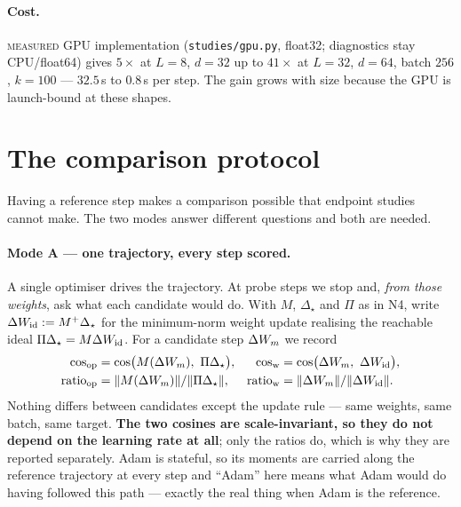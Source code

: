 \documentclass{article}
\newcommand{\RUN}{{\color{blue!70!black}\textsc{measured}}}
\theoremstyle{plain}\newtheorem{theorem}{Theorem}\newtheorem{lemma}[theorem]{Lemma}
\theoremstyle{definition}\newtheorem{definition}[theorem]{Definition}
\newcommand{\Dstar}{\Delta_\star}\newcommand{\Lam}{\Lambda}
\begin{document}
\paragraph{Cost.} \RUN{} GPU implementation (\texttt{studies/gpu.py}, float32; diagnostics stay
CPU/float64) gives $5\times$ at $L{=}8$, $d{=}32$ up to $41\times$ at $L{=}32$, $d{=}64$,
batch $256$, $k{=}100$ --- $32.5$\,s to $0.8$\,s per step. The gain grows with size because the
GPU is launch-bound at these shapes.

\section{The comparison protocol}\label{sec:protocol}

Having a reference step makes a comparison possible that endpoint studies cannot make. The two
modes answer different questions and both are needed.

\paragraph{Mode A --- one trajectory, every step scored.}
A single optimiser drives the trajectory. At probe steps we stop and, \emph{from those weights},
ask what each candidate would do. With $M$, $\Dstar$ and $\Pi$ as in N4, write
$\dW_{\mathrm{id}}:=M^{+}\Dstar$ for the minimum-norm weight update realising the reachable ideal
$\Pi\Dstar=M\dW_{\mathrm{id}}$. For a candidate step $\Delta W_m$ we record
\begin{align*}
  \cos_{\mathrm{op}} &= \cos\!\big(M(\dW_m),\ \Pi\Dstar\big),
  &\cos_{\mathrm{w}} &= \cos\!\big(\dW_m,\ \dW_{\mathrm{id}}\big),\\
  \mathrm{ratio}_{\mathrm{op}} &= \|M(\dW_m)\|/\|\Pi\Dstar\|,
  &\mathrm{ratio}_{\mathrm{w}} &= \|\dW_m\|/\|\dW_{\mathrm{id}}\|.
\end{align*}
Nothing differs between candidates except the update rule --- same weights, same batch, same
target. \textbf{The two cosines are scale-invariant, so they do not depend on the learning rate at
all}; only the ratios do, which is why they are reported separately. Adam is stateful, so its
moments are carried along the reference trajectory at every step and ``Adam'' here means what Adam
would do having followed this path --- exactly the real thing when Adam is the reference.
\end{document}
